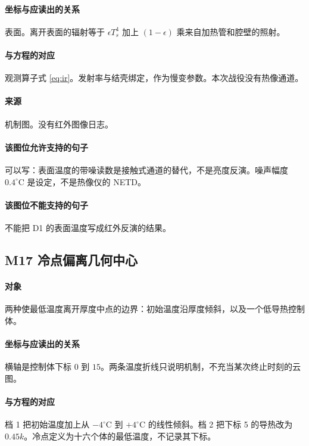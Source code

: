 \paragraph{坐标与应读出的关系}
表面。离开表面的辐射等于 $\epsilon T_s^4$ 加上 $(1-\epsilon)$ 乘来自加热管和腔壁的照射。

\paragraph{与方程的对应}
观测算子式 \eqref{eq:ir}。发射率与结壳绑定，作为慢变参数。本次战役没有热像通道。

\paragraph{来源}
机制图。没有红外图像日志。

\paragraph{该图位允许支持的句子}
可以写：表面温度的带噪读数是接触式通道的替代，不是亮度反演。噪声幅度 $0.4^\circ\mathrm{C}$ 是设定，不是热像仪的 NETD。

\paragraph{该图位不能支持的句子}
不能把 D1 的表面温度写成红外反演的结果。

\subsection{M17 冷点偏离几何中心}
\paragraph{对象}
两种使最低温度离开厚度中点的边界：初始温度沿厚度倾斜，以及一个低导热控制体。

\paragraph{坐标与应读出的关系}
横轴是控制体下标 $0$ 到 $15$。两条温度折线只说明机制，不充当某次终止时刻的云图。

\paragraph{与方程的对应}
档 1 把初始温度加上从 $-4^\circ\mathrm{C}$ 到 $+4^\circ\mathrm{C}$ 的线性倾斜。档 2 把下标 5 的导热改为 $0.45k$。冷点定义为十六个体的最低温度，不记录其下标。

